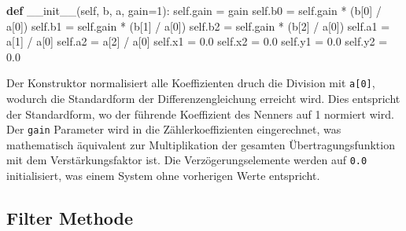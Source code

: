 \documentclass[
  ngerman,
  letterpaper,
  DIV=11]{scrreprt}
\newenvironment{Shaded}{\begin{snugshade}}{\end{snugshade}}
\newcommand{\DecValTok}[1]{\textcolor[rgb]{0.68,0.00,0.00}{#1}}
\newcommand{\FloatTok}[1]{\textcolor[rgb]{0.68,0.00,0.00}{#1}}
\newcommand{\FunctionTok}[1]{\textcolor[rgb]{0.28,0.35,0.67}{#1}}
\newcommand{\KeywordTok}[1]{\textcolor[rgb]{0.00,0.23,0.31}{\textbf{#1}}}
\newcommand{\NormalTok}[1]{\textcolor[rgb]{0.00,0.23,0.31}{#1}}
\newcommand{\OperatorTok}[1]{\textcolor[rgb]{0.37,0.37,0.37}{#1}}
\newcommand{\VariableTok}[1]{\textcolor[rgb]{0.07,0.07,0.07}{#1}}
\begin{document}
\begin{Shaded}
\begin{Highlighting}[]
    \KeywordTok{def} \FunctionTok{\_\_init\_\_}\NormalTok{(}\VariableTok{self}\NormalTok{, b, a, gain}\OperatorTok{=}\DecValTok{1}\NormalTok{):}
        \VariableTok{self}\NormalTok{.gain }\OperatorTok{=}\NormalTok{ gain}
        \VariableTok{self}\NormalTok{.b0 }\OperatorTok{=} \VariableTok{self}\NormalTok{.gain }\OperatorTok{*}\NormalTok{ (b[}\DecValTok{0}\NormalTok{] }\OperatorTok{/}\NormalTok{ a[}\DecValTok{0}\NormalTok{])}
        \VariableTok{self}\NormalTok{.b1 }\OperatorTok{=} \VariableTok{self}\NormalTok{.gain }\OperatorTok{*}\NormalTok{ (b[}\DecValTok{1}\NormalTok{] }\OperatorTok{/}\NormalTok{ a[}\DecValTok{0}\NormalTok{])}
        \VariableTok{self}\NormalTok{.b2 }\OperatorTok{=} \VariableTok{self}\NormalTok{.gain }\OperatorTok{*}\NormalTok{ (b[}\DecValTok{2}\NormalTok{] }\OperatorTok{/}\NormalTok{ a[}\DecValTok{0}\NormalTok{])}
        \VariableTok{self}\NormalTok{.a1 }\OperatorTok{=}\NormalTok{ a[}\DecValTok{1}\NormalTok{] }\OperatorTok{/}\NormalTok{ a[}\DecValTok{0}\NormalTok{]}
        \VariableTok{self}\NormalTok{.a2 }\OperatorTok{=}\NormalTok{ a[}\DecValTok{2}\NormalTok{] }\OperatorTok{/}\NormalTok{ a[}\DecValTok{0}\NormalTok{]}
        \VariableTok{self}\NormalTok{.x1 }\OperatorTok{=} \FloatTok{0.0}
        \VariableTok{self}\NormalTok{.x2 }\OperatorTok{=} \FloatTok{0.0}
        \VariableTok{self}\NormalTok{.y1 }\OperatorTok{=} \FloatTok{0.0}
        \VariableTok{self}\NormalTok{.y2 }\OperatorTok{=} \FloatTok{0.0}
\end{Highlighting}
\end{Shaded}

Der Konstruktor normalisiert alle Koeffizienten druch die Division mit
\texttt{a{[}0{]}}, wodurch die Standardform der Differenzengleichung
erreicht wird. Dies entspricht der Standardform, wo der führende
Koeffizient des Nenners auf 1 normiert wird. Der \texttt{gain} Parameter
wird in die Zählerkoeffizienten eingerechnet, was mathematisch
äquivalent zur Multiplikation der gesamten Übertragungsfunktion mit dem
Verstärkungsfaktor ist. Die Verzögerungselemente werden auf \texttt{0.0}
initialisiert, was einem System ohne vorherigen Werte entspricht.

\subsection{Filter Methode}\label{filter-methode-3}
\end{document}
